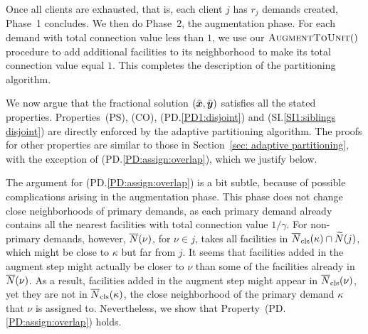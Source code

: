Once all clients are exhausted, that is, each client $j$ has $r_j$ demands created, 
Phase~1 concludes. We then do Phase~2, the augmentation phase.
For each demand with total connection value less than $1$, we use our
${\textsc{AugmentToUnit}}()$ procedure to add additional facilities to
its neighborhood to make its total connection value equal $1$. 
This completes the description of the partitioning algorithm.

\smallskip

We now argue that the fractional solution $(\bar{\boldsymbol{x}},\bar{\boldsymbol{y}})$ 
satisfies all the stated properties. Properties~(PS), (CO),
(PD.\ref{PD1:disjoint}) and (SI.\ref{SI1:siblings disjoint})  are
directly enforced by the adaptive partitioning algorithm. The
proofs for other properties are similar to those in 
Section~\ref{sec: adaptive partitioning}, with the
exception of (PD.\ref{PD:assign:overlap}), which we justify below.

The argument for (PD.\ref{PD:assign:overlap}) is a bit subtle, because
of possible complications arising in the augmentation phase.
This phase does not change close neighborhoods of primary demands, as each primary demand
already contains all the nearest facilities with total connection
value $1/\gamma$. 
For non-primary demands, however, ${\overline{N}}(\nu)$, for $\nu\in j$, takes all 
facilities in ${\overline{N}}_{\text{cls}}(\kappa)\cap {\widetilde N}(j)$, which
might be close to $\kappa$ but far from $j$. 
It seems that
facilities added in the augment step might actually be
closer to $\nu$ than some of the facilities
already in ${\overline{N}}(\nu)$. As a result, facilities added in
the augment step might appear in 
${\overline{N}}_{\text{cls}}(\nu)$, yet they are not in ${\overline{N}}_{\text{cls}}(\kappa)$,
the close neighborhood
of the primary demand $\kappa$ that $\nu$ is assigned to.  
Nevertheless, we show that Property~(PD.\ref{PD:assign:overlap}) holds.

